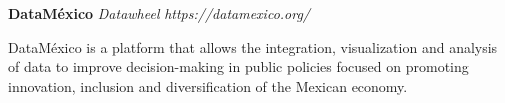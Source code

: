\item
\headerrow
{\textbf{DataMéxico}}
{\emph{}}
\headerrow
{\emph{Datawheel}}
{\emph{https://datamexico.org/}}
\begin{itemize*}
    \item DataMéxico is a platform that allows the integration, visualization 
    and analysis of data to improve decision-making in public policies focused 
    on promoting innovation, inclusion and diversification of the Mexican economy.
\end{itemize*}